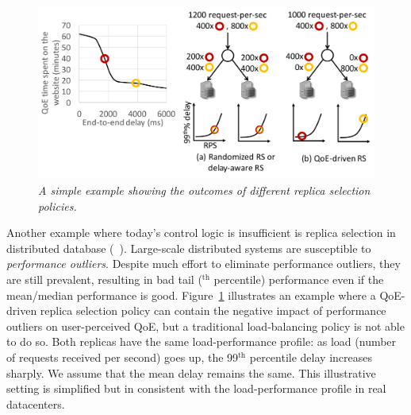 
\begin{figure}
	\centering
	\includegraphics[width=1\textwidth]{figs/replica.pdf}
	\vspace{-0.9cm}
	\caption{\em A simple example showing the outcomes of different replica selection policies.}
	\label{fig:replica}
\end{figure}
Another example where today's control logic is insufficient is replica selection in distributed database (\eg~\cite{cassandra}).
Large-scale distributed systems are susceptible to {\em performance outliers}.
Despite much effort to eliminate performance outliers, they are still prevalent, resulting in bad tail ($^\textrm{th}$ percentile) performance even if the mean/median performance is good.
Figure~\ref{fig:replica} illustrates an example where a QoE-driven replica selection policy can contain the negative impact of performance outliers on user-perceived QoE, but a traditional load-balancing policy is not able to do so.
Both replicas have the same load-performance profile: as load (number of requests received per second) goes up, the 99$^\textrm{th}$ percentile delay increases sharply. We assume that the mean delay remains the same. 
This illustrative setting is simplified but in consistent with the load-performance profile in real datacenters.%
